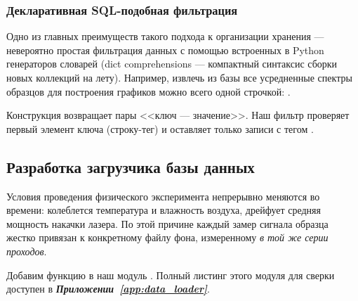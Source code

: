 \subsubsection{Декларативная SQL-подобная фильтрация}

Одно из главных преимуществ такого подхода к организации хранения --- невероятно простая фильтрация данных с помощью встроенных в Python генераторов словарей (dict comprehensions --- компактный синтаксис сборки новых коллекций на лету). Например, извлечь из базы все усредненные спектры образцов для построения графиков можно всего одной строчкой: .

Конструкция  возвращает пары <<ключ --- значение>>. Наш фильтр проверяет первый элемент ключа  (строку-тег) и оставляет только записи с тегом .

\subsection{Разработка загрузчика базы данных}\label{ssec:load_dataset}

Условия проведения физического эксперимента непрерывно меняются во времени: колеблется температура и влажность воздуха, дрейфует средняя мощность накачки лазера. По этой причине каждый замер сигнала образца жестко привязан к конкретному файлу фона, измеренному \textit{в той же серии проходов}.


Добавим функцию  в наш модуль . Полный листинг этого модуля для сверки доступен в \textbf{\textit{Приложении~\ref{app:data_loader}}}.

